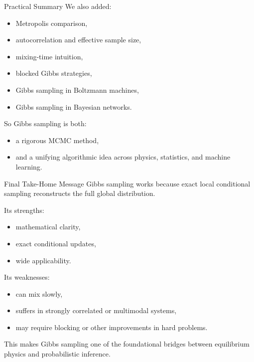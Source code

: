 \documentclass[aspectratio=169]{beamer}
\begin{document}
\begin{frame}{Practical Summary}
We also added:
\begin{itemize}
    \item Metropolis comparison,
    \item autocorrelation and effective sample size,
    \item mixing-time intuition,
    \item blocked Gibbs strategies,
    \item Gibbs sampling in Boltzmann machines,
    \item Gibbs sampling in Bayesian networks.
\end{itemize}

So Gibbs sampling is both:
\begin{itemize}
    \item a rigorous MCMC method,
    \item and a unifying algorithmic idea across physics, statistics, and machine learning.
\end{itemize}
\end{frame}

\begin{frame}{Final Take-Home Message}
Gibbs sampling works because exact local conditional sampling reconstructs the full global distribution.

\medskip

Its strengths:
\begin{itemize}
    \item mathematical clarity,
    \item exact conditional updates,
    \item wide applicability.
\end{itemize}

Its weaknesses:
\begin{itemize}
    \item can mix slowly,
    \item suffers in strongly correlated or multimodal systems,
    \item may require blocking or other improvements in hard problems.
\end{itemize}

This makes Gibbs sampling one of the foundational bridges between equilibrium physics and probabilistic inference.
\end{frame}
\end{document}
